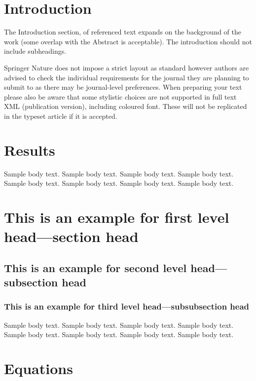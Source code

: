 \documentclass{sn-jnl}
\theoremstyle{thmstyleone}%
\theoremstyle{thmstyletwo}%
\theoremstyle{thmstylethree}%
\begin{document}
\section{Introduction}\label{sec1}

The Introduction section, of referenced text \cite{shamshirband2013appraisala} expands on the background of the work (some overlap with the Abstract is acceptable). The introduction should not include subheadings.

Springer Nature does not impose a strict \cite{shamshirband2013appraisalb}layout as standard however authors are advised to check the individual requirements for the journal they are planning to submit to as there may be journal-level preferences. When preparing your text please also be aware that some stylistic choices are not supported in full text XML (publication version), including coloured font. These will not be replicated in the typeset article if it is accepted. \cite{bonabeau2002agent}\cite{singh2015autonomous} \cite{wooldridge2009introduction}

\section{Results}\label{sec2}

Sample body text. Sample body text. Sample body text. Sample body text. Sample body text. Sample body text. Sample body text. Sample body text.

\section{This is an example for first level head---section head}\label{sec3}

\subsection{This is an example for second level head---subsection head}\label{subsec2}

\subsubsection{This is an example for third level head---subsubsection head}\label{subsubsec2}

Sample body text. Sample body text. Sample body text. Sample body text. Sample body text. Sample body text. Sample body text. Sample body text. 

\section{Equations}\label{sec4}
\end{document}
